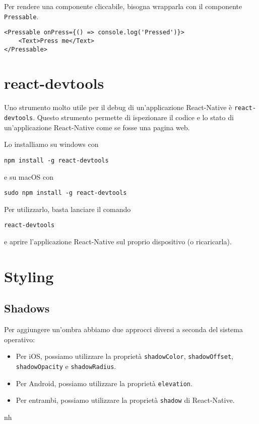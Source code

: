 \documentclass[12pt]{article}
\begin{document}
Per rendere una componente cliccabile, bisogna
wrapparla con il componente \texttt{Pressable}.
\begin{highlight}
\begin{verbatim}
<Pressable onPress={() => console.log('Pressed')}>
    <Text>Press me</Text>
</Pressable>
\end{verbatim}
\end{highlight}


\section{react-devtools}
Uno strumento molto utile per il debug di un'applicazione React-Native è
\texttt{react-devtools}. Questo strumento permette di ispezionare il codice
e lo stato di un'applicazione React-Native come se fosse una pagina web.

Lo installiamo su windows con 
\begin{highlight}
\begin{verbatim}
npm install -g react-devtools
\end{verbatim}  
\end{highlight}
e su macOS con
\begin{highlight}
\begin{verbatim}
sudo npm install -g react-devtools
\end{verbatim}
\end{highlight}

Per utilizzarlo, basta lanciare il comando
\begin{highlight}
\begin{verbatim}
react-devtools
\end{verbatim}
\end{highlight}
e aprire l'applicazione React-Native sul proprio dispositivo (o ricaricarla).





\section{Styling}
\subsection{Shadows}
Per aggiungere un'ombra abbiamo due approcci diversi a seconda del sistema operativo:
\begin{itemize}
\item Per iOS, possiamo utilizzare la proprietà \texttt{shadowColor}, \texttt{shadowOffset}, \texttt{shadowOpacity} e \texttt{shadowRadius}.
\item Per Android, possiamo utilizzare la proprietà \texttt{elevation}.
\item Per entrambi, possiamo utilizzare la proprietà \texttt{shadow} di React-Native.
\end{itemize}nh
\end{document}
